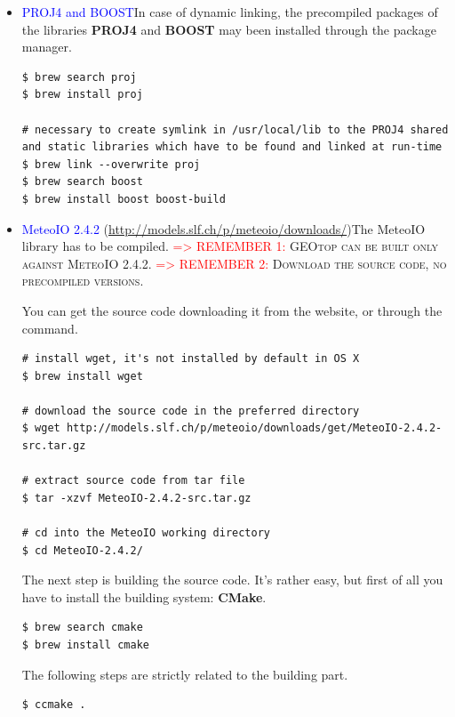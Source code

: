 \begin{itemize}
\item \textcolor{blue}{PROJ4 and BOOST}\newline In case of dynamic linking, the precompiled packages of the libraries \textbf{PROJ4} and \textbf{BOOST} may been installed through the package manager.

\begin{lstlisting}[style=bashStyle]
$ brew search proj
$ brew install proj

# necessary to create symlink in /usr/local/lib to the PROJ4 shared and static libraries which have to be found and linked at run-time
$ brew link --overwrite proj
$ brew search boost
$ brew install boost boost-build
\end{lstlisting} %

\item \textcolor{blue}{MeteoIO 2.4.2} (\url{http://models.slf.ch/p/meteoio/downloads/})\newline The MeteoIO library has to be compiled.
\newline\textsc{\textcolor{red}{=> REMEMBER 1:} GEOtop can be built only against MeteoIO 2.4.2.}
\newline\textsc{\textcolor{red}{=> REMEMBER 2:} Download the source code, no precompiled versions.}

You can get the source code downloading it from the website, or through the  command.

\begin{lstlisting}[style=bashStyle]
# install wget, it's not installed by default in OS X
$ brew install wget

# download the source code in the preferred directory
$ wget http://models.slf.ch/p/meteoio/downloads/get/MeteoIO-2.4.2-src.tar.gz

# extract source code from tar file
$ tar -xzvf MeteoIO-2.4.2-src.tar.gz

# cd into the MeteoIO working directory
$ cd MeteoIO-2.4.2/
\end{lstlisting}
The next step is building the source code. It's rather easy, but first of all you have to install the building system: \textbf{CMake}.

\begin{lstlisting}[style=bashStyle]
$ brew search cmake
$ brew install cmake
\end{lstlisting}
The following steps are strictly related to the building part.

\begin{lstlisting}[style=bashStyle]
$ ccmake .
\end{lstlisting} %


\end{itemize}
